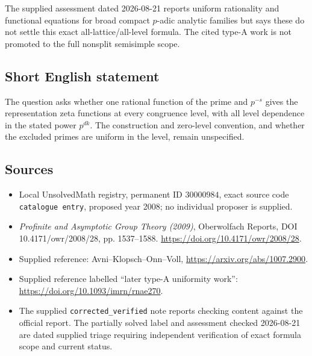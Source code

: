 \documentclass[11pt]{article}
\begin{document}
The supplied assessment dated 2026-08-21 reports uniform rationality and functional equations for broad compact \(p\)-adic analytic families but says these do not settle this exact all-lattice/all-level formula. The cited type-A work is not promoted to the full nonsplit semisimple scope.
\subsection{Short English statement}
The question asks whether one rational function of the prime and \(p^{-s}\) gives the representation zeta functions at every congruence level, with all level dependence in the stated power \(p^{dk}\). The construction and zero-level convention, and whether the excluded primes are uniform in the level, remain unspecified.
\subsection{Sources}
\begin{itemize}
\item Local UnsolvedMath registry, permanent ID \(30000984\), exact source code \texttt{catalogue entry}, proposed year 2008; no individual proposer is supplied.
\item \emph{Profinite and Asymptotic Group Theory (2009)}, Oberwolfach Reports, DOI 10.4171/owr/2008/28, pp. 1537--1588. \url{https://doi.org/10.4171/owr/2008/28}.
\item Supplied reference: Avni--Klopsch--Onn--Voll, \url{https://arxiv.org/abs/1007.2900}.
\item Supplied reference labelled ``later type-A uniformity work'': \url{https://doi.org/10.1093/imrn/rnae270}.
\item The supplied \texttt{corrected\_verified} note reports checking content against the official report. The partially solved label and assessment checked 2026-08-21 are dated supplied triage requiring independent verification of exact formula scope and current status.
\end{itemize}
\end{document}
